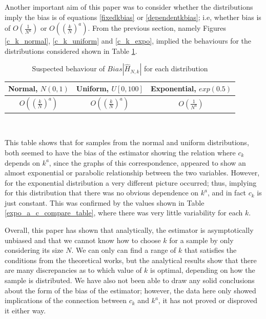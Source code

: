 \documentclass[12pt]{report}
\begin{document}
Another important aim of this paper was to consider whether the distributions imply the bias is of equations \ref{fixedkbias} or \ref{dependentkbias}; i.e, whether bias is of $O \left( \frac{1}{N^{a}} \right)$ or $O\left( \left( \frac{k}{N} \right)^{a} \right)$. From the previous section, namely Figures \ref{c_k_normal}, \ref{c_k_uniform} and \ref{c_k_expo}, implied the behaviours for the distributions considered shown in Table \ref{distribution_comparison}.

\begin{table}
\caption{Suspected behaviour of $Bias |\hat{H}_{N, k} |$ for each distribution} \label{distribution_comparison}
\begin{center}
\begin{tabular}{| c | c | c|} 
\toprule
Normal, $N(0,1)$ & Uniform, $U[0,100]$ & Exponential, $exp(0.5)$ \\
\midrule[1pt]
$O\left( \left( \frac{k}{N} \right)^{a} \right)$ & $O\left( \left( \frac{k}{N} \right)^{a} \right)$ &  $O \left( \frac{1}{N^{a}} \right)$ \\
\hline
\end{tabular}
\\[10pt]
\end{center}
\end{table}

This table shows that for samples from the normal and uniform distributions, both seemed to have the bias of the estimator showing the relation where $c_{k}$ depends on $k^a$, since the graphs of this correspondence, appeared to show an almost exponential or parabolic relationship between the two variables. However, for the exponential distribution a very different picture occurred; thus, implying for this distribution that there was no obvious dependence on $k^a$, and in fact $c_{k}$ is just constant. This was confirmed by the values shown in Table \ref{expo_a_c_compare_table}, where there was very little variability for each $k$.

Overall, this paper has shown that analytically, the estimator is asymptotically unbiased and that we cannot know how to choose $k$ for a sample by only considering its size $N$. We can only can find a range of $k$ that satisfies the conditions from the theoretical works, but the analytical results show that there are many discrepancies as to which value of $k$ is optimal, depending on how the sample is distributed. We have also not been able to draw any solid conclusions about the form of the bias of the estimator; however, the data here only showed implications of the connection between $c_{k}$ and $k^a$, it has not proved or disproved it either way.
\end{document}
